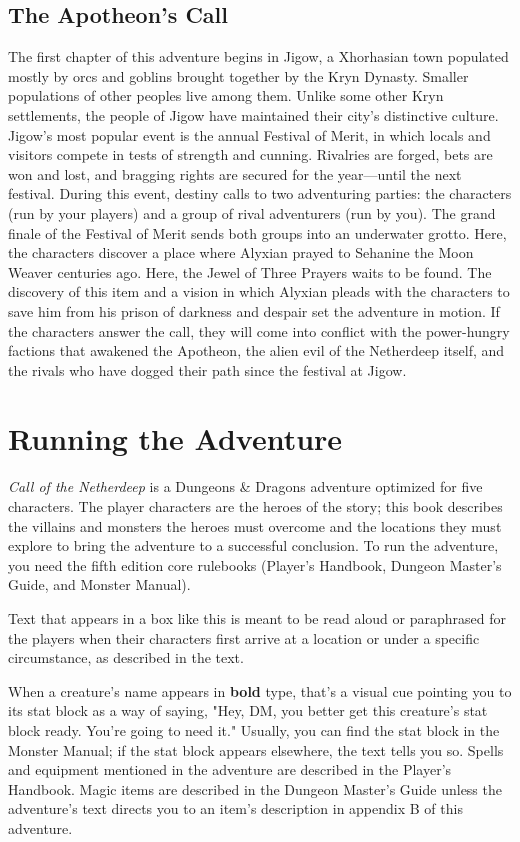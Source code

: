 \documentclass[10pt,a4,twoside,twocolumn,openany,nodeprecatedcode]{dndbook}
\begin{document}
\subsection{The Apotheon's Call}
The first chapter of this adventure begins in Jigow, a Xhorhasian town populated mostly by orcs and goblins brought together by the Kryn Dynasty. Smaller populations of other peoples live among them. Unlike some other Kryn settlements, the people of Jigow have maintained their city's distinctive culture. Jigow's most popular event is the annual Festival of Merit, in which locals and visitors compete in tests of strength and cunning. Rivalries are forged, bets are won and lost, and bragging rights are secured for the year—until the next festival.
During this event, destiny calls to two adventuring parties: the characters (run by your players) and a group of rival adventurers (run by you). The grand finale of the Festival of Merit sends both groups into an underwater grotto. Here, the characters discover a place where Alyxian prayed to Sehanine the Moon Weaver centuries ago. Here, the Jewel of Three Prayers waits to be found. The discovery of this item and a vision in which Alyxian pleads with the characters to save him from his prison of darkness and despair set the adventure in motion. If the characters answer the call, they will come into conflict with the power-hungry factions that awakened the Apotheon, the alien evil of the Netherdeep itself, and the rivals who have dogged their path since the festival at Jigow.
\section{Running the Adventure}
\textit{Call of the Netherdeep} is a Dungeons \& Dragons adventure optimized for five characters. The player characters are the heroes of the story; this book describes the villains and monsters the heroes must overcome and the locations they must explore to bring the adventure to a successful conclusion.
To run the adventure, you need the fifth edition core rulebooks (Player's Handbook, Dungeon Master's Guide, and Monster Manual).
\begin{DndReadAloud}{}
Text that appears in a box like this is meant to be read aloud or paraphrased for the players when their characters first arrive at a location or under a specific circumstance, as described in the text.
\end{DndReadAloud}

When a creature's name appears in \textbf{bold} type, that's a visual cue pointing you to its stat block as a way of saying, "Hey, DM, you better get this creature's stat block ready. You're going to need it." Usually, you can find the stat block in the Monster Manual; if the stat block appears elsewhere, the text tells you so.
Spells and equipment mentioned in the adventure are described in the Player's Handbook. Magic items are described in the Dungeon Master's Guide unless the adventure's text directs you to an item's description in appendix B of this adventure.
\end{document}
